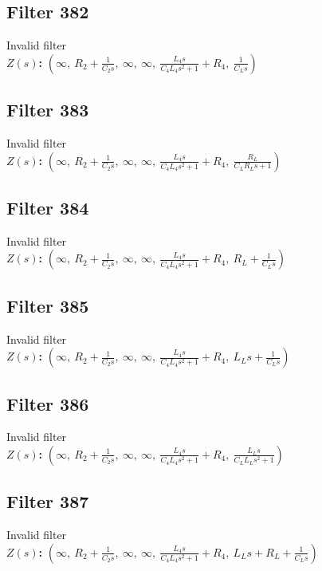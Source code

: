 \documentclass{article}
\begin{document}
\subsection*{Filter 382}
Invalid filter \\ 
\textbf{$Z(s)$:} $\left( \infty, \  R_{2} + \frac{1}{C_{2} s}, \  \infty, \  \infty, \  \frac{L_{4} s}{C_{4} L_{4} s^{2} + 1} + R_{4}, \  \frac{1}{C_{L} s}\right)$ \\ 
\subsection*{Filter 383}
Invalid filter \\ 
\textbf{$Z(s)$:} $\left( \infty, \  R_{2} + \frac{1}{C_{2} s}, \  \infty, \  \infty, \  \frac{L_{4} s}{C_{4} L_{4} s^{2} + 1} + R_{4}, \  \frac{R_{L}}{C_{L} R_{L} s + 1}\right)$ \\ 
\subsection*{Filter 384}
Invalid filter \\ 
\textbf{$Z(s)$:} $\left( \infty, \  R_{2} + \frac{1}{C_{2} s}, \  \infty, \  \infty, \  \frac{L_{4} s}{C_{4} L_{4} s^{2} + 1} + R_{4}, \  R_{L} + \frac{1}{C_{L} s}\right)$ \\ 
\subsection*{Filter 385}
Invalid filter \\ 
\textbf{$Z(s)$:} $\left( \infty, \  R_{2} + \frac{1}{C_{2} s}, \  \infty, \  \infty, \  \frac{L_{4} s}{C_{4} L_{4} s^{2} + 1} + R_{4}, \  L_{L} s + \frac{1}{C_{L} s}\right)$ \\ 
\subsection*{Filter 386}
Invalid filter \\ 
\textbf{$Z(s)$:} $\left( \infty, \  R_{2} + \frac{1}{C_{2} s}, \  \infty, \  \infty, \  \frac{L_{4} s}{C_{4} L_{4} s^{2} + 1} + R_{4}, \  \frac{L_{L} s}{C_{L} L_{L} s^{2} + 1}\right)$ \\ 
\subsection*{Filter 387}
Invalid filter \\ 
\textbf{$Z(s)$:} $\left( \infty, \  R_{2} + \frac{1}{C_{2} s}, \  \infty, \  \infty, \  \frac{L_{4} s}{C_{4} L_{4} s^{2} + 1} + R_{4}, \  L_{L} s + R_{L} + \frac{1}{C_{L} s}\right)$ \\ 
\end{document}
